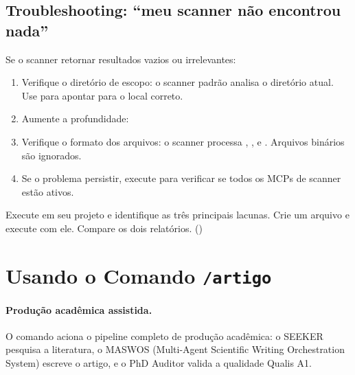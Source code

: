 \subsection{Troubleshooting: \enquote{meu scanner não encontrou nada}}
\label{subsec:troubleshooting-scanner}

Se o scanner retornar resultados vazios ou irrelevantes:

\begin{enumerate}
\item Verifique o diretório de escopo: o scanner padrão analisa o
      diretório atual. Use 
      para apontar para o local correto.
\item Aumente a profundidade: 
\item Verifique o formato dos arquivos: o scanner processa
      , ,  e .
      Arquivos binários são ignorados.
\item Se o problema persistir, execute 
      para verificar se todos os MCPs de scanner estão ativos.
\end{enumerate}

\begin{exercicio}
Execute  em seu projeto e identifique as
três principais lacunas. Crie um arquivo
 e execute 
com ele. Compare os dois relatórios. (\nivelintermediario)
\end{exercicio}

\section{Usando o Comando \texttt{/artigo}}
\label{sec:artigo}
\nivelintermediario

\paragraph{Produção acadêmica assistida.} O comando 
aciona o pipeline completo de produção acadêmica: o SEEKER pesquisa a
literatura, o MASWOS (Multi-Agent Scientific Writing Orchestration System)
escreve o artigo, e o PhD Auditor valida a qualidade Qualis A1.

